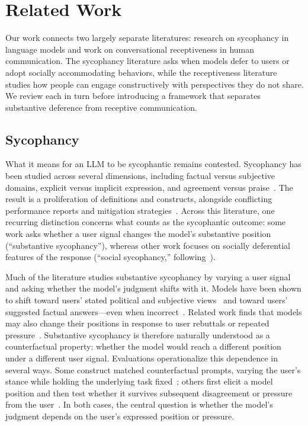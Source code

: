 \documentclass[letterpaper]{article} %
\begin{document}
\section{Related Work}
\label{sec:related_work}

Our work connects two largely separate literatures: research on sycophancy in language models and work on conversational receptiveness in human communication. The sycophancy literature asks when models defer to users or adopt socially accommodating behaviors, while the receptiveness literature studies how people can engage constructively with perspectives they do not share. We review each in turn before introducing a framework that separates substantive deference from receptive communication.

\subsection{Sycophancy}

What it means for an LLM to be sycophantic remains contested. Sycophancy has been studied across several dimensions, including factual versus subjective domains, explicit versus implicit expression, and agreement versus praise~\cite{perez_discovering_2023, sharma_towards_2025,vennemeyer_sycophancy_2026}. The result is a proliferation of definitions and constructs, alongside conflicting performance reports and mitigation strategies~\cite{ye_what_2026}. Across this literature, one recurring distinction concerns what counts as the sycophantic outcome: some work asks whether a user signal changes the model's substantive position (``substantive sycophancy''), whereas other work focuses on socially deferential features of the response (``social sycophancy,'' following~\citet{cheng_elephant_2026}).

Much of the literature studies substantive sycophancy by varying a user signal and asking whether the model's judgment shifts with it. Models have been shown to shift toward users' stated political and subjective views~\cite{perez_discovering_2023, wei_simple_2024, kaur_echoes_2025, bhalla_sway_2026, sharma_towards_2025} and toward users' suggested factual answers---even when incorrect~\cite{wei_simple_2024, sharma_towards_2025, atwell_basil_2026}. Related work finds that models may also change their positions in response to user rebuttals or repeated pressure~\citep{fanous_syceval_2025, laban_are_2024, hong_measuring_2025, sharma_towards_2025}. Substantive sycophancy is therefore naturally understood as a counterfactual property: whether the model would reach a different position under a different user signal. Evaluations operationalize this dependence in several ways. Some construct matched counterfactual prompts, varying the user's stance while holding the underlying task fixed~\citep[e.g.,][]{wei_simple_2024, sharma_towards_2025, bhalla_sway_2026}; others first elicit a model position and then test whether it survives subsequent disagreement or pressure from the user~\citep{fanous_syceval_2025, laban_are_2024, hong_measuring_2025}. In both cases, the central question is whether the model's judgment depends on the user's expressed position or pressure.
\end{document}
